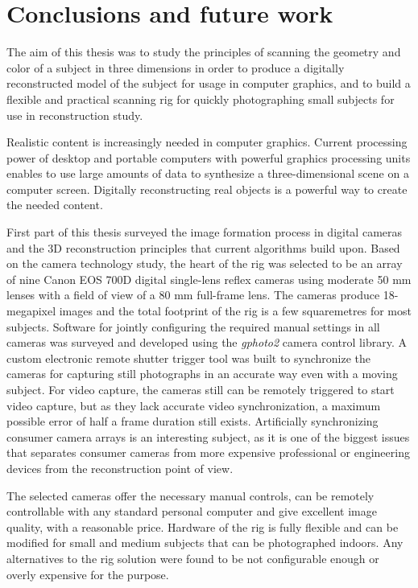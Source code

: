 \section{Conclusions and future work} \label{sec:conclusion}
The aim of this thesis was to study the principles of scanning the geometry and color of a subject in three dimensions in order to produce a digitally reconstructed model of the subject for usage in computer graphics, and to build a flexible and practical scanning rig for quickly photographing small subjects for use in reconstruction study.

Realistic content is increasingly needed in computer graphics.
Current processing power of desktop and portable computers with powerful graphics processing units enables to use large amounts of data to synthesize a three-dimensional scene on a computer screen.
Digitally reconstructing real objects is a powerful way to create the needed content.

First part of this thesis surveyed the image formation process in digital cameras and the 3D reconstruction principles that current algorithms build upon.
Based on the camera technology study, the heart of the rig was selected to be an array of nine Canon EOS 700D digital single-lens reflex cameras using moderate 50 mm lenses with a field of view of a 80 mm full-frame lens.
The cameras produce 18-megapixel images and the total footprint of the rig is a few squaremetres for most subjects.
Software for jointly configuring the required manual settings in all cameras was surveyed and developed using the \emph{gphoto2} camera control library.
A custom electronic remote shutter trigger tool was built to synchronize the cameras for capturing still photographs in an accurate way even with a moving subject.
For video capture, the cameras still can be remotely triggered to start video capture, but as they lack accurate video synchronization, a maximum possible error of half a frame duration still exists.
Artificially synchronizing consumer camera arrays is an interesting subject, as it is one of the biggest issues that separates consumer cameras from more expensive professional or engineering devices from the reconstruction point of view.

The selected cameras offer the necessary manual controls, can be remotely controllable with any standard personal computer and give excellent image quality, with a reasonable price.
Hardware of the rig is fully flexible and can be modified for small and medium subjects that can be photographed indoors.
Any alternatives to the rig solution were found to be not configurable enough or overly expensive for the purpose.

